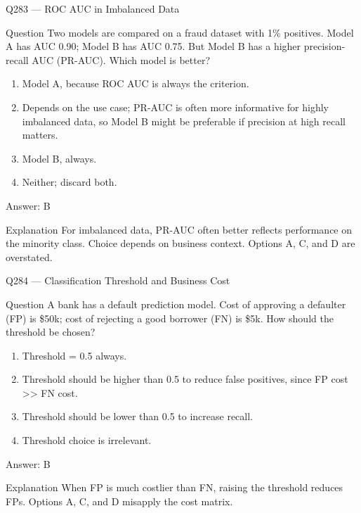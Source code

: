 \documentclass[aspectratio=169,8pt]{beamer}
\begin{document}
\begin{frame}{Q283 --- ROC AUC in Imbalanced Data}
\begin{block}{Question}
Two models are compared on a fraud dataset with 1\% positives. Model A has AUC 0.90; Model B has AUC 0.75. But Model B has a higher precision-recall AUC (PR-AUC). Which model is better?
\end{block}
\begin{enumerate}
\item Model A, because ROC AUC is always the criterion.
\item Depends on the use case; PR-AUC is often more informative for highly imbalanced data, so Model B might be preferable if precision at high recall matters.
\item Model B, always.
\item Neither; discard both.
\end{enumerate}
\begin{exampleblock}{Answer: B}\end{exampleblock}
\begin{block}{Explanation}
For imbalanced data, PR-AUC often better reflects performance on the minority class. Choice depends on business context. Options A, C, and D are overstated.
\end{block}
\end{frame}

\begin{frame}{Q284 --- Classification Threshold and Business Cost}
\begin{block}{Question}
A bank has a default prediction model. Cost of approving a defaulter (FP) is \$50k; cost of rejecting a good borrower (FN) is \$5k. How should the threshold be chosen?
\begin{enumerate}
\item Threshold = 0.5 always.
\item Threshold should be higher than 0.5 to reduce false positives, since FP cost >> FN cost.
\item Threshold should be lower than 0.5 to increase recall.
\item Threshold choice is irrelevant.
\end{enumerate}\end{block}
\begin{exampleblock}{Answer: B}\end{exampleblock}
\begin{block}{Explanation}
When FP is much costlier than FN, raising the threshold reduces FPs. Options A, C, and D misapply the cost matrix.
\end{block}
\end{frame}
\end{document}
